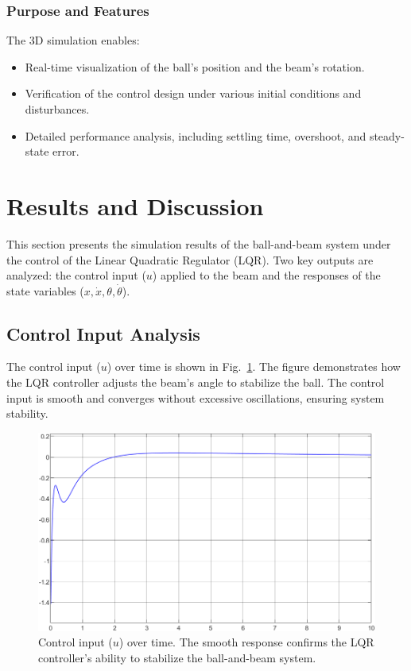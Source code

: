 \documentclass[conference]{IEEEtran}
\begin{document}
\subsubsection{Purpose and Features}
The 3D simulation enables:
\begin{itemize}
    \item Real-time visualization of the ball's position and the beam's rotation.
    \item Verification of the control design under various initial conditions and disturbances.
    \item Detailed performance analysis, including settling time, overshoot, and steady-state error.
\end{itemize}

\section{Results and Discussion}
\label{sec:results}

This section presents the simulation results of the ball-and-beam system under the control of the Linear Quadratic Regulator (LQR). Two key outputs are analyzed: the control input (\(u\)) applied to the beam and the responses of the state variables (\(x, \dot{x}, \theta, \dot{\theta}\)).

\subsection{Control Input Analysis}
The control input (\(u\)) over time is shown in Fig.~\ref{fig:control_input_scope}. The figure demonstrates how the LQR controller adjusts the beam's angle to stabilize the ball. The control input is smooth and converges without excessive oscillations, ensuring system stability.

\begin{figure}[H]
    \centering
    \includegraphics[width=\linewidth]{figures/control_input_scope.png}
    \caption[]{Control input (\(u\)) over time. The smooth response confirms the LQR controller's ability to stabilize the ball-and-beam system.}
    \label{fig:control_input_scope}
\end{figure}
\end{document}
